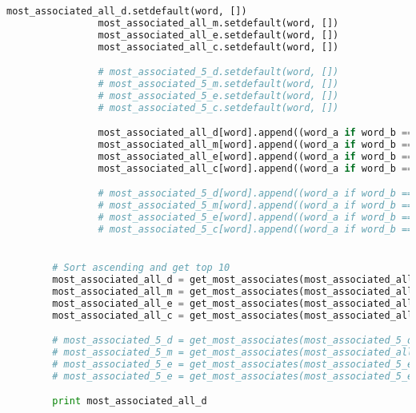 \documentclass[letterpaper,11pt]{article}
\begin{document}
\begin{lstlisting}[language=python, caption={Association Measure}, label={lst:assoc_measure}]
                most_associated_all_d.setdefault(word, [])
                most_associated_all_m.setdefault(word, [])
                most_associated_all_e.setdefault(word, [])
                most_associated_all_c.setdefault(word, [])

                # most_associated_5_d.setdefault(word, [])
                # most_associated_5_m.setdefault(word, [])
                # most_associated_5_e.setdefault(word, [])
                # most_associated_5_c.setdefault(word, [])

                most_associated_all_d[word].append((word_a if word_b == word else word_b, dice_window_size_all))
                most_associated_all_m[word].append((word_a if word_b == word else word_b, mim_window_size_all))
                most_associated_all_e[word].append((word_a if word_b == word else word_b, emim_window_size_all))
                most_associated_all_c[word].append((word_a if word_b == word else word_b, chi_square_window_size_all))

                # most_associated_5_d[word].append((word_a if word_b == word else word_b, dice_window_size_5))
                # most_associated_5_m[word].append((word_a if word_b == word else word_b, mim_window_size_5))
                # most_associated_5_e[word].append((word_a if word_b == word else word_b, emim_window_size_5))
                # most_associated_5_c[word].append((word_a if word_b == word else word_b, chi_square_window_size_5))


        # Sort ascending and get top 10
        most_associated_all_d = get_most_associates(most_associated_all_d)
        most_associated_all_m = get_most_associates(most_associated_all_m)
        most_associated_all_e = get_most_associates(most_associated_all_e)
        most_associated_all_c = get_most_associates(most_associated_all_c)

        # most_associated_5_d = get_most_associates(most_associated_5_d)
        # most_associated_5_m = get_most_associates(most_associated_all_d)
        # most_associated_5_e = get_most_associates(most_associated_5_e)
        # most_associated_5_e = get_most_associates(most_associated_5_e)

        print most_associated_all_d


\end{lstlisting}
\end{document}
